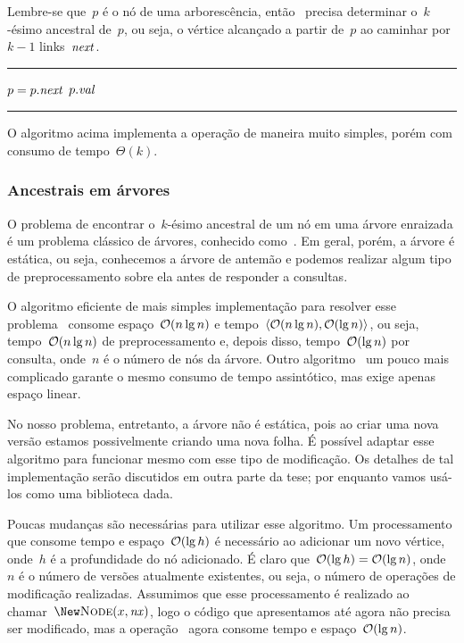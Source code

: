 \documentclass[quali.tex]{subfile}
\begin{document}
Lembre-se que~$p$ é o nó de uma arborescência, então~ precisa determinar o~$k$-ésimo ancestral de~$p$, ou seja, o vértice alcançado a partir de~$p$ ao caminhar por~$k - 1$ links~$\mathit{next}$. \\

\hrule
\begin{algorithmic}[1]
        \State $p = p.\mathit{next}$
    \EndFor
    \State \Return $p.\mathit{val}$
\EndFunction
\end{algorithmic}
\hrule
\vspace{1em}

O algoritmo acima implementa a operação de maneira muito simples, porém com consumo de tempo~$\Theta(k)$.

\subsubsection{Ancestrais em árvores}

O problema de encontrar o~$k$-ésimo ancestral de um nó em uma árvore enraizada é um problema clássico de árvores, conhecido como~. Em geral, porém, a árvore é estática, ou seja, conhecemos a árvore de antemão e podemos realizar algum tipo de preprocessamento sobre ela antes de responder a consultas.

O algoritmo eficiente de mais simples implementação para resolver esse problema~\cite{BenderM-F2004} consome espaço~$\mathcal{O}(n \lg n)$ e tempo~${\langle\mathcal{O}(n \lg n), \mathcal{O}(\lg n)\rangle}$, ou seja, tempo~$\mathcal{O}(n \lg n)$ de preprocessamento e, depois disso, tempo~$\mathcal{O}(\lg n)$ por consulta, onde~$n$ é o número de nós da árvore. Outro algoritmo~\cite{Myers83} um pouco mais complicado garante o mesmo consumo de tempo assintótico, mas exige apenas espaço linear.

No nosso problema, entretanto, a árvore não é estática, pois ao criar uma nova versão estamos possivelmente criando uma nova folha. É possível adaptar esse algoritmo para funcionar mesmo com esse tipo de modificação. Os detalhes de tal implementação serão discutidos em outra parte da tese; por enquanto vamos usá-los como uma biblioteca dada.

Poucas mudanças são necessárias para utilizar esse algoritmo. Um processamento que consome tempo e espaço~$\mathcal{O}(\lg h)$ é necessário ao adicionar um novo vértice, onde~$h$ é a profundidade do nó adicionado. É claro que~$\mathcal{O}(\lg h) = \mathcal{O}(\lg n)$, onde~$n$ é o número de versões atualmente existentes, ou seja, o número de operações de modificação realizadas. Assumimos que esse processamento é realizado ao chamar~$\New \Call{Node}{x, \V{nx}}$, logo o código que apresentamos até agora não precisa ser modificado, mas a operação~ agora consome tempo e espaço~$\mathcal{O}(\lg n)$.
\end{document}
